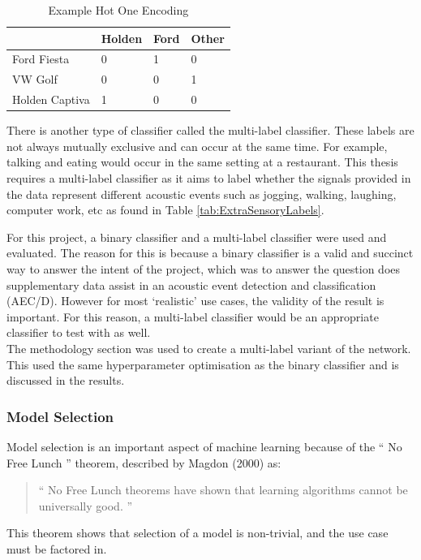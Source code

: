 \documentclass{UoNMCHA}
\newcommand{\inlineQuote}[1]{`` #1 ''}
\newcommand{\fancyquote}[1]{\begin{quotation}\inlineQuote{#1}\end{quotation}}
\newcommand{\tref}[1] {Table \ref{#1}}
\numberwithin{equation}{section}
\begin{document}
\begin{table}[h]
    \begin{center}  
    \caption{Example Hot One Encoding}\label{tab:HotOneEnc}
        \begin{tabular}{llll}
            \hline\hline
                           & Holden & Ford & Other \\\hline
                            
            Ford Fiesta    & 0      & 1    & 0     \\
            VW Golf        & 0      & 0    & 1     \\
            Holden Captiva & 1      & 0    & 0     \\
            \hline
        \end{tabular}
    \end{center}
\end{table}

There is another type of classifier called the multi-label classifier. These labels are not always mutually exclusive and can occur at the same time. For example, talking and eating would occur in the same setting at a restaurant. This thesis requires a multi-label classifier as it aims to label whether the signals provided in the data represent different acoustic events such as jogging, walking, laughing, computer work, etc as found in \tref{tab:ExtraSensoryLabels}. %

For this project, a binary classifier and a multi-label classifier were used and evaluated. The reason for this is because a binary classifier is a valid and succinct way to answer the intent of the project, which was to answer the question does supplementary data assist in an acoustic event detection and classification (AEC/D). However for most `realistic' use cases, the validity of the result is important. For this reason, a multi-label classifier would be an appropriate classifier to test with as well.\\

The methodology section was used to create a multi-label variant of the network. This used the same hyperparameter optimisation as the binary classifier and is discussed in the results. 

\subsubsection{Model Selection}
Model selection is an important aspect of machine learning because of the \inlineQuote{No Free Lunch} theorem, described by Magdon (2000) as: 
\fancyquote{No Free Lunch theorems have shown that learning algorithms cannot be universally good. \cite{NFL_quote}}
This theorem shows that selection of a model is non-trivial, and the use case must be factored in.\\
\end{document}
